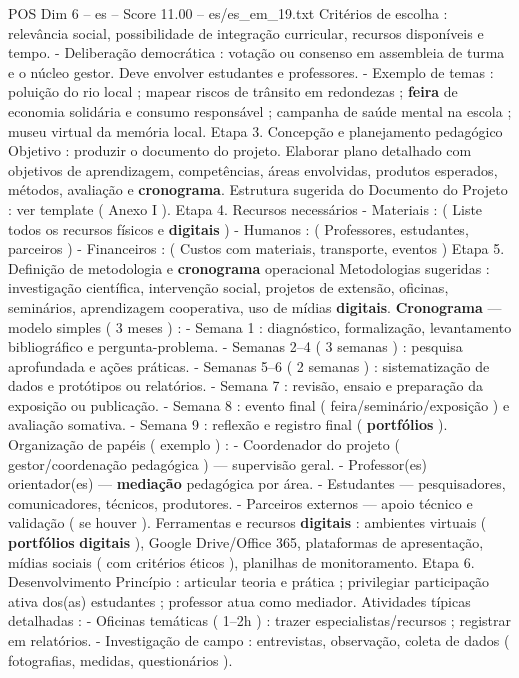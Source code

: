\begin{textsample}{POS Dim 6 – es – Score 11.00 – es/es\_em\_19.txt}
Critérios de escolha : relevância social, possibilidade de integração curricular, recursos disponíveis e tempo. - Deliberação democrática : votação ou consenso em assembleia de turma e o núcleo gestor.
Deve envolver estudantes e professores. - Exemplo de temas : poluição do rio local ; mapear riscos de trânsito em redondezas ; \textbf{feira} de economia solidária e consumo responsável ; campanha de saúde mental na escola ; museu virtual da memória local.
Etapa 3.
Concepção e planejamento pedagógico Objetivo : produzir o documento do projeto.
Elaborar plano detalhado com objetivos de aprendizagem, competências, áreas envolvidas, produtos esperados, métodos, avaliação e \textbf{cronograma}.
Estrutura sugerida do Documento do Projeto : ver template ( Anexo I ).
Etapa 4.
Recursos necessários - Materiais : ( Liste todos os recursos físicos e \textbf{digitais} ) - Humanos : ( Professores, estudantes, parceiros ) - Financeiros : ( Custos com materiais, transporte, eventos ) Etapa 5.
Definição de metodologia e \textbf{cronograma} operacional Metodologias sugeridas : investigação científica, intervenção social, projetos de extensão, oficinas, seminários, aprendizagem cooperativa, uso de mídias \textbf{digitais}. \textbf{Cronograma} — modelo simples ( 3 meses ) : - Semana 1 : diagnóstico, formalização, levantamento bibliográfico e pergunta-problema. - Semanas 2–4 ( 3 semanas ) : pesquisa aprofundada e ações práticas. - Semanas 5–6 ( 2 semanas ) : sistematização de dados e protótipos ou relatórios. - Semana 7 : revisão, ensaio e preparação da exposição ou publicação. - Semana 8 : evento final ( feira/seminário/exposição ) e avaliação somativa. - Semana 9 : reflexão e registro final ( \textbf{portfólios} ).
Organização de papéis ( exemplo ) : - Coordenador do projeto ( gestor/coordenação pedagógica ) — supervisão geral. - Professor(es) orientador(es) — \textbf{mediação} pedagógica por área. - Estudantes — pesquisadores, comunicadores, técnicos, produtores. - Parceiros externos — apoio técnico e validação ( se houver ).
Ferramentas e recursos \textbf{digitais} : ambientes virtuais ( \textbf{portfólios} \textbf{digitais} ), Google Drive/Office 365, plataformas de apresentação, mídias sociais ( com critérios éticos ), planilhas de monitoramento.
Etapa 6.
Desenvolvimento Princípio : articular teoria e prática ; privilegiar participação ativa dos(as) estudantes ; professor atua como mediador.
Atividades típicas detalhadas : - Oficinas temáticas ( 1–2h ) : trazer especialistas/recursos ; registrar em relatórios. - Investigação de campo : entrevistas, observação, coleta de dados ( fotografias, medidas, questionários ).

\end{textsample}

